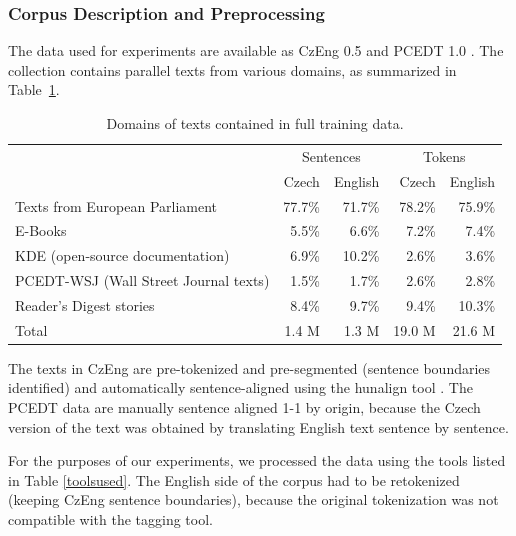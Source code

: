\documentclass[11pt]{report}
\theoremstyle{plain}
\begin{document}
{{\subsubsection{Corpus Description and Preprocessing}
\label{tools}


The data used for \bidir{} experiments are available as CzEng 0.5
 and PCEDT 1.0 . The collection contains parallel texts from various domains, as
summarized in Table~\ref{czengratios}.


\begin{table}[ht]
\begin{tabular}{lrr|rr}
  &  \multicolumn{2}{c}{Sentences}  &  \multicolumn{2}{c}{Tokens}\\
  &  Czech                             &  English                          &  Czech  &  English\\
\hline
Texts from European Parliament         &  77.7\%  &  71.7\%  &  78.2\%  &  75.9\%\\
E-Books                                &  5.5\%   &  6.6\%   &  7.2\%   &  7.4\%\\
KDE (open-source documentation)        &  6.9\%   &  10.2\%  &  2.6\%   &  3.6\%\\
PCEDT-WSJ (Wall Street Journal texts)  &  1.5\%   &  1.7\%   &  2.6\%   &  2.8\%\\
Reader's Digest stories                &  8.4\%   &  9.7\%   &  9.4\%   &  10.3\%\\
\hline
Total                                  &  1.4 M   &  1.3 M   &  19.0 M  &  21.6 M\\
\end{tabular}
\caption{Domains of texts contained in full training data.}
\label{czengratios}
\end{table}

The texts in CzEng are pre-tokenized and pre-segmented (sentence boundaries identified) and
automatically sentence-aligned using the hunalign tool
. The
PCEDT data are manually sentence aligned 1-1 by origin, because the Czech
version of the text was obtained by translating English text sentence by
sentence.

For the purposes of our experiments, we processed the data using the tools
listed in Table \ref{toolsused}.
The English side of the corpus had to be retokenized (keeping CzEng sentence
boundaries), because the original tokenization was not compatible with the tagging tool.

}}
\end{document}

